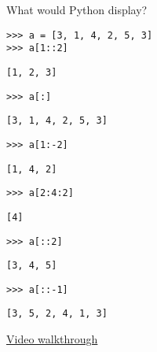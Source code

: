 \question What would Python display?
\begin{lstlisting}
>>> a = [3, 1, 4, 2, 5, 3]
>>> a[1::2]
\end{lstlisting}
\begin{solution}[.25in]
    \lstinline$[1, 2, 3]$
\end{solution}

\begin{lstlisting}
>>> a[:]
\end{lstlisting}
\begin{solution}[.25in]
    \lstinline$[3, 1, 4, 2, 5, 3]$
\end{solution}

\begin{lstlisting}
>>> a[1:-2]
\end{lstlisting}
\begin{solution}[.25in]
    \lstinline$[1, 4, 2]$
\end{solution}

\begin{lstlisting}
>>> a[2:4:2]
\end{lstlisting}
\begin{solution}[.25in]
	\lstinline$[4]$
\end{solution}

\begin{lstlisting}
>>> a[::2]
\end{lstlisting}
\begin{solution}[.25in]
	\lstinline$[3, 4, 5]$
\end{solution}

\begin{lstlisting}
>>> a[::-1]
\end{lstlisting}
\begin{solution}
    \lstinline$[3, 5, 2, 4, 1, 3]$
\end{solution}
\begin{solution}
\href{https://youtu.be/zP4jWZpwACM?t=25m41s}{Video walkthrough}
\end{solution}
